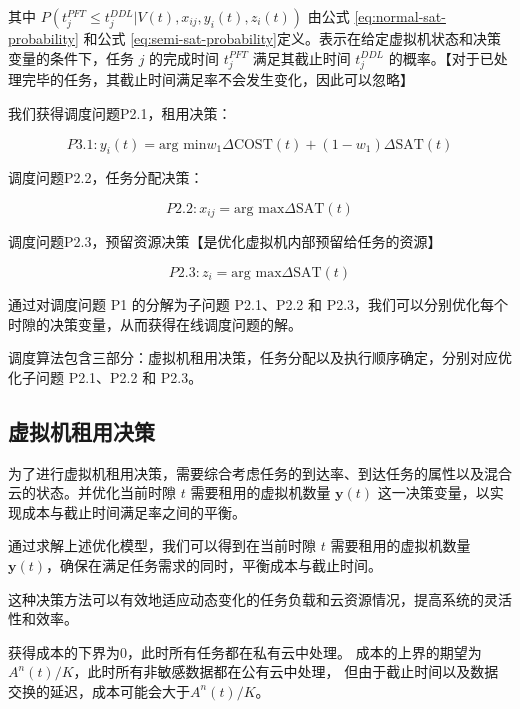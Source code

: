 其中 \( P(t^{PFT}_j \le t^{DDL}_j | V(t), x_{ij}, y_i(t), z_i(t)) \) 由公式 \eqref{eq:normal-sat-probability} 和公式 \eqref{eq:semi-sat-probability}定义。表示在给定虚拟机状态和决策变量的条件下，任务 \( j \) 的完成时间 \( t^{PFT}_j \) 满足其截止时间 \( t^{DDL}_j \) 的概率。【对于已处理完毕的任务，其截止时间满足率不会发生变化，因此可以忽略】

我们获得调度问题P2.1，租用决策：

\begin{equation}
    P3.1:
    y_i(t) = \text{arg min} w_1 \Delta \text{COST}(t) + (1 - w_1) \Delta \text{SAT}(t)
    \label{eq:opt-p2-cost}
\end{equation}

调度问题P2.2，任务分配决策：

\begin{equation}
    P2.2:
    x_{ij} = \text{arg max} \Delta \text{SAT}(t)
    \label{eq:opt-p2-offload}
\end{equation}

调度问题P2.3，预留资源决策【是优化虚拟机内部预留给任务的资源】

\begin{equation}
    P2.3:
    z_{i} = \text{arg max} \Delta \text{SAT}(t)
    \label{eq:opt-p2-reserve}
\end{equation}

通过对调度问题 P1 的分解为子问题 P2.1、P2.2 和 P2.3，我们可以分别优化每个时隙的决策变量，从而获得在线调度问题的解。

调度算法包含三部分：虚拟机租用决策，任务分配以及执行顺序确定，分别对应优化子问题 P2.1、P2.2 和 P2.3。

\subsection{虚拟机租用决策}

为了进行虚拟机租用决策，需要综合考虑任务的到达率、到达任务的属性以及混合云的状态。并优化当前时隙 $t$ 需要租用的虚拟机数量 $\mathbf{y}(t)$ 这一决策变量，以实现成本与截止时间满足率之间的平衡。

通过求解上述优化模型，我们可以得到在当前时隙 $t$ 需要租用的虚拟机数量 $\mathbf{y}(t)$，确保在满足任务需求的同时，平衡成本与截止时间。

这种决策方法可以有效地适应动态变化的任务负载和云资源情况，提高系统的灵活性和效率。

获得成本的下界为0，此时所有任务都在私有云中处理。
成本的上界的期望为$A^n(t) / K$，此时所有非敏感数据都在公有云中处理，
但由于截止时间以及数据交换的延迟，成本可能会大于$A^n(t) / K$。

